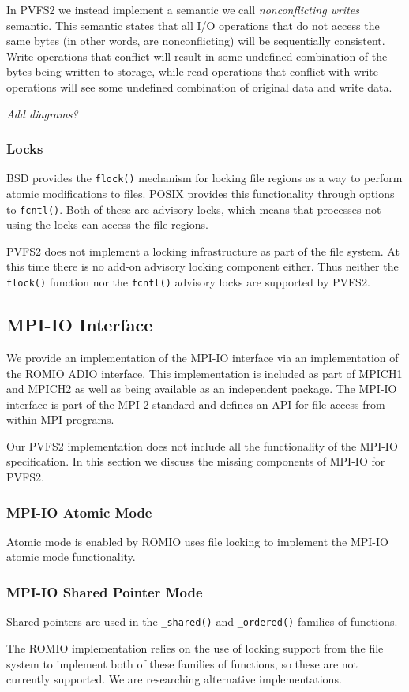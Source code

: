 In PVFS2 we instead implement a semantic we call \emph{nonconflicting writes}
semantic.  This semantic states that all I/O operations that do not access the
same bytes (in other words, are nonconflicting) will be sequentially
consistent.  Write operations that conflict will result in some undefined
combination of the bytes being written to storage, while read operations that
conflict with write operations will see some undefined combination of original
data and write data.

\emph{ Add diagrams? }

\subsubsection{Locks}

BSD provides the \texttt{flock()} mechanism for locking file regions as a way
to perform atomic modifications to files.  POSIX provides this functionality
through options to \texttt{fcntl()}.  Both of these are advisory locks, which
means that processes not using the locks can access the file regions.

PVFS2 does not implement a locking infrastructure as part of the file system.
At this time there is no add-on advisory locking component either.  Thus
neither the \texttt{flock()} function nor the \texttt{fcntl()} advisory locks
are supported by PVFS2.

\subsection{MPI-IO Interface}

We provide an implementation of the MPI-IO interface via an implementation of
the ROMIO ADIO interface.  This implementation is included as part of MPICH1
and MPICH2 as well as being available as an independent package.  The MPI-IO
interface is part of the MPI-2 standard and defines an API for file access
from within MPI programs.

Our PVFS2 implementation does not include all the functionality of the MPI-IO
specification.  In this section we discuss the missing components of MPI-IO
for PVFS2.

\subsubsection{MPI-IO Atomic Mode}

Atomic mode is enabled by ROMIO uses file locking to implement the MPI-IO
atomic mode functionality.

\subsubsection{MPI-IO Shared Pointer Mode}

Shared pointers are used in the \texttt{\_shared()} and \texttt{\_ordered()}
families of functions.

The ROMIO implementation relies on the use of locking support from the file
system to implement both of these families of functions, so these are not
currently supported.  We are researching alternative implementations.

